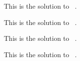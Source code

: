 \documentclass{article}
\begin{document}

\begin{problem}[points=2]
  \lipsum[3]
\end{problem}
\begin{answer}
  This is the solution to \ExerciseType\ .
\end{answer}

\begin{problem}[points=1]
  \lipsum[3]
\end{problem}
\begin{answer}
  This is the solution to \ExerciseType\ .
\end{answer}

\begin{question}
  \lipsum[5]
\end{question}
\begin{solution}
  This is the solution to \ExerciseType\ .
\end{solution}

\begin{question}[print=false]
  \lipsum[5]
\end{question}
\begin{solution}
  This is the solution to \ExerciseType\ .
\end{solution}


\printsolutions
\end{document}
